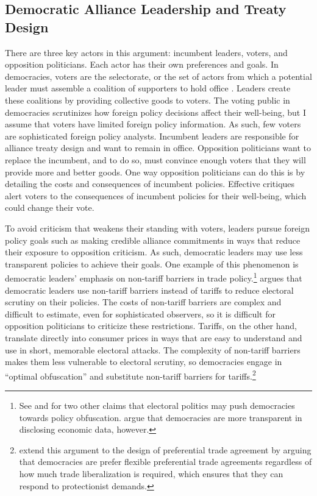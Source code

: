\documentclass[12pt]{article}
\begin{document}
\subsection{Democratic Alliance Leadership and Treaty Design}


There are three key actors in this argument: incumbent leaders, voters, and opposition politicians. 
Each actor has their own preferences and goals. 
In democracies, voters are the selectorate, or the set of actors from which a potential leader must assemble a coalition of supporters to hold office \citep{BDMetal2002}. 
Leaders create these coalitions by providing collective goods to voters.
The voting public in democracies scrutinizes how foreign policy decisions affect their well-being, but I assume that voters have limited foreign policy information. 
As such, few voters are sophisticated foreign policy analysts. 
Incumbent leaders are responsible for alliance treaty design and want to remain in office.
Opposition politicians want to replace the incumbent, and to do so, must convince enough voters that they will provide more and better goods. 
One way opposition politicians can do this is by detailing the costs and consequences of incumbent policies.
Effective critiques alert voters to the consequences of incumbent policies for their well-being, which could change their vote. 


To avoid criticism that weakens their standing with voters, leaders pursue foreign policy goals such as making credible alliance commitments in ways that reduce their exposure to opposition criticism.
As such, democratic leaders may use less transparent policies to achieve their goals.  
One example of this phenomenon is democratic leaders' emphasis on non-tariff barriers in trade policy.\footnote{See \citet{Rejali2007} and \citet{Stasavage2004} for two other claims that electoral politics may push democracies towards policy obfuscation. \citet{Hollyeretal2011} argue that democracies are more transparent in disclosing economic data, however.}
\citet{Kono2006} argues that democratic leaders use non-tariff barriers instead of tariffs to reduce electoral scrutiny on their policies.
The costs of non-tariff barriers are complex and difficult to estimate, even for sophisticated observers, so it is difficult for opposition politicians to criticize these restrictions. 
Tariffs, on the other hand, translate directly into consumer prices in ways that are easy to understand and use in short, memorable electoral attacks.
The complexity of non-tariff barriers makes them less vulnerable to electoral scrutiny, so democracies engage in ``optimal obfuscation'' and substitute non-tariff barriers for tariffs.\footnote{\citet{Baccinietal2015} extend this argument to the design of preferential trade agreement by arguing that democracies are prefer flexible preferential trade agreements regardless of how much trade liberalization is required, which ensures that they can respond to protectionist demands.}  
\end{document}
